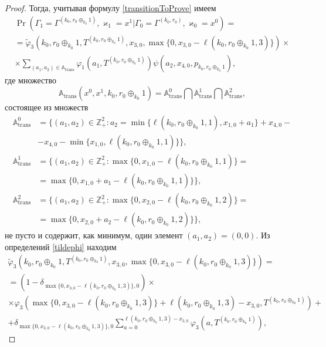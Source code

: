 \documentclass[a4paper,12pt,russian]{extarticle}
\begin{document}
\begin{proof}
Тогда, учитывая формулу \eqref{transitionToProve} имеем
\begin{multline*}
\Pr (\Gamma_{1}=\Gamma^{(k_0,r_0\oplus_{k_0}1)},\varkappa_{1}=x^1 | \Gamma_{0}=\Gamma^{(k_0,r_0)},\varkappa_0=x^0)=\\
=\widetilde{\varphi}_3(k_0,r_0\oplus_{k_0}1,T^{(k_0,r_0\oplus_{k_0}1)},x_{3,0},\max{\{0,x_{3,0} - \ell(k_0,r_0\oplus_{k_0}1,3)\}})\times \\
\times
\sum_{(a_1,a_2)\in {\mathbb A}_{\mathrm{trans}}}\varphi_1(a_1,T^{(k_0,r_0\oplus_{k_0}1)})  \psi(a_2,x_{4,0}, p_{k_0,r_0\oplus_{k_0}1}),
\end{multline*}
где множество 
\begin{equation*}
{\mathbb A}_{\mathrm{trans}}(x^0,x^1,k_0,r_0\oplus_{k_0}1) = {\mathbb A}_{\mathrm{trans}}^0 \bigcap {\mathbb A}_{\mathrm{trans}}^1\bigcap {\mathbb A}_{\mathrm{trans}}^2,
\end{equation*}
состоящее из множеств 
\begin{align*}
{\mathbb A}_{\mathrm{trans}}^0 &= \{(a_1,a_2) \in \mathbb{Z}_+^2 \colon a_2 = \min{\{\ell(k_0,r_0\oplus_{k_0}1,1), x_{1,0}+a_1}\} +x_{4,0}- \\ 
&-x_{4,0} - \min{\{x_{1,0}, \ell(k_0,r_0\oplus_{k_0}1,1)\}}\},\\
{\mathbb A}_{\mathrm{trans}}^1 &= \{(a_1,a_2) \in \mathbb{Z}_+^2 \colon \max{\{0,x_{1,0} - \ell(k_0,r_0\oplus_{k_0}1,1)\}}=\\
&=\max{\{0,x_{1,0}+a_1-\ell(k_0,r_0\oplus_{k_0}1,1)\}}\},\\
 {\mathbb A}_{\mathrm{trans}}^2 &= \{(a_1,a_2) \in \mathbb{Z}_+^2 \colon  \max{\{0,x_{2,0} - \ell(k_0,r_0\oplus_{k_0}1,2)\}}=\\
 &=\max{\{0,x_{2,0}+a_2-\ell(k_0,r_0\oplus_{k_0}1,2)\}}\},
\end{align*}
не пусто и содержит, как минимум, один элемент $(a_1,a_2)=(0,0)$. Из определений \eqref{tildephi} находим
\begin{multline*}
\widetilde{\varphi}_3(k_0,r_0\oplus_{k_0}1,T^{(k_0,r_0\oplus_{k_0}1)},x_{3,0},\max{\{0,x_{3,0} - \ell(k_0,r_0\oplus_{k_0}1,3)\}})= \\=(1-\delta_{\max{\{0,x_{3,0} - \ell(k_0,r_0\oplus_{k_0}1,3)\}},0}) \times \\\times\varphi_3(\max{\{0,x_{3,0} - \ell(k_0,r_0\oplus_{k_0}1,3)\}} + \ell (k_0,r_0\oplus_{k_0}1,3) - x_{3,0},T^{(k_0,r_0\oplus_{k_0}1)} ) +\\
+\delta_{\max{\{0,x_{3,0} - \ell(k_0,r_0\oplus_{k_0}1,3)\}},0} \sum_{a=0}^{\ell(k_0,r_0\oplus_{k_0}1,3)-x_{3,0}}\varphi_3 (a,T^{(k_0,r_0\oplus_{k_0}1)}),

\end{multline*}
\end{proof}
\end{document}
